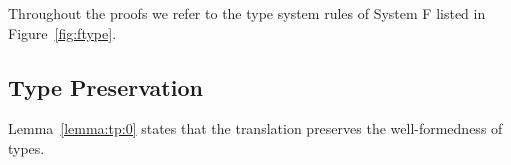 Throughout the proofs we refer to the type system rules of System F listed
in Figure~\ref{fig:ftype}.

\subsection{Type Preservation}\label{proof:preservation}

Lemma~\ref{lemma:tp:0} states that the translation preserves the well-formedness of types. 

{\centering
{}}

